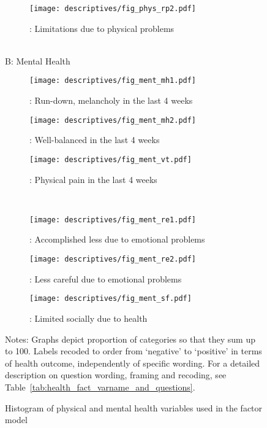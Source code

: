 \begin{figure}[ht!]
\begin{subfigure}{.30\textwidth}
    \texttt{[image: descriptives/fig\_phys\_rp2.pdf]}
    \caption{: Limitations due to physical problems}
    \label{fig:rp2}
  \end{subfigure}\hfill%
  \\  %
  B: Mental Health
  \\  %
  \begin{subfigure}{.30\textwidth}
    \texttt{[image: descriptives/fig\_ment\_mh1.pdf]}
    \caption{: Run-down, melancholy in the last 4 weeks}
    \label{fig:mh1}
\end{subfigure}\hfill%
  \begin{subfigure}{.30\textwidth}
    \texttt{[image: descriptives/fig\_ment\_mh2.pdf]}
    \caption{: Well-balanced in the last 4 weeks}
    \label{fig:mh2}
\end{subfigure}\hfill%
  \begin{subfigure}{.30\textwidth}
    \texttt{[image: descriptives/fig\_ment\_vt.pdf]}
    \caption{: Physical pain in the last 4 weeks}
    \label{fig:vt}
\end{subfigure}\hfill%
  \\  %
  \begin{subfigure}{.30\textwidth}
    \texttt{[image: descriptives/fig\_ment\_re1.pdf]}
    \caption{: Accomplished less due to emotional problems}
    \label{fig:re1}
\end{subfigure}\hfill%
  \begin{subfigure}{.30\textwidth}
    \texttt{[image: descriptives/fig\_ment\_re2.pdf]}
    \caption{: Less careful due to emotional problems}
    \label{fig:re2}
\end{subfigure}\hfill%
  \begin{subfigure}{.30\textwidth}
    \texttt{[image: descriptives/fig\_ment\_sf.pdf]}
    \caption{: Limited socially due to health \phantom{text}}
    \label{fig:sf}
\end{subfigure}\hfill%
    \caption[Histogram of health variables used in the factor model]
    {Histogram of physical and mental health variables used in the factor model} \par \footnotesize
    \vspace{5pt} 
    Notes: Graphs depict proportion of categories so that they sum up to 100. 
    Labels recoded to order from `negative' to `positive' in terms of health outcome, independently of specific wording.
    For a detailed description on question wording, framing and recoding, see Table~\ref{tab:health_fact_varname_and_questions}.
    \label{fig:main_multifig_phys}
\end{figure}


